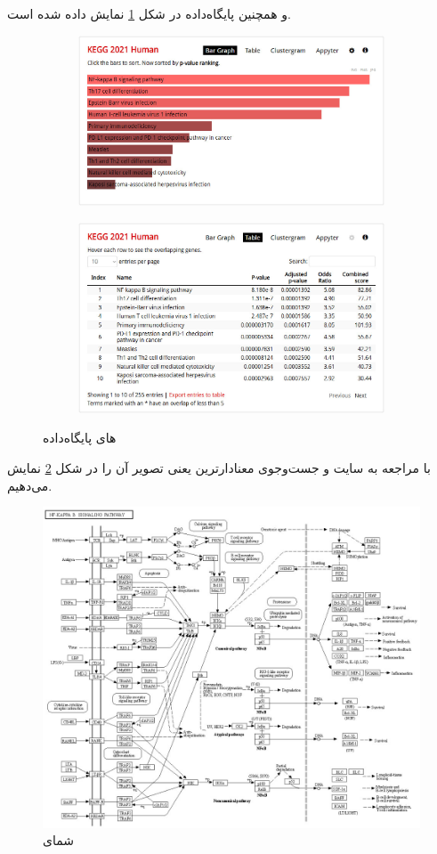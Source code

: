\documentclass{article}
\begin{document}
و همچنین پایگاه‌داده  در شکل \ref{fig:enrichr-pathways-kegg} نمایش داده شده است.
\begin{figure}[h!]
	\begin{subfigure}{.53\columnwidth}
		\centering
		\includegraphics[width=\columnwidth]{figs/enrichr-pathways-kegg.jpg}
	\end{subfigure}
	\begin{subfigure}{.47\columnwidth}
		\centering
		\includegraphics[width=\columnwidth]{figs/enrichr-pathways-kegg-tab.jpg}
	\end{subfigure}
	\caption{های پایگاه‌داده }
	\label{fig:enrichr-pathways-kegg}
\end{figure}

با مراجعه به سایت \href{https://www.genome.jp}{} و جست‌و‌جوی معنادارترین  یعنی
تصویر آن را در شکل \ref{fig:kegg-pathway} نمایش می‌دهیم.
\begin{figure}[h!]
	\centering
	\includegraphics[width=0.5\columnwidth]{figs/kegg-pathway.jpg}
	\caption{شمای }
	\label{fig:kegg-pathway}
\end{figure}
\end{document}
